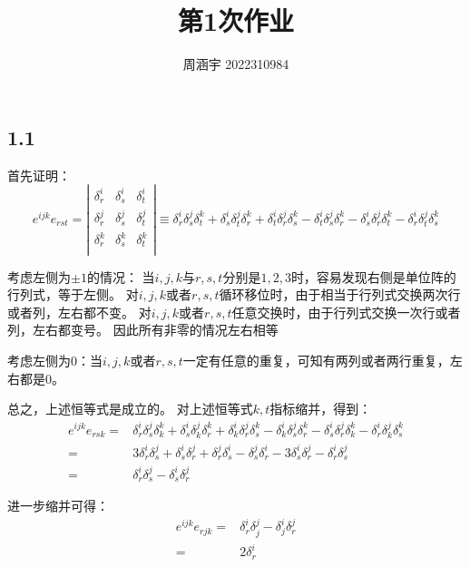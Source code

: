 \documentclass[UTF8,zihao=5]{ctexart}
\title{{\bfseries 第1次作业}}
\author{周涵宇 2022310984}
\date{}
\begin{document}
\maketitle

\subsection*{1.1}


首先证明：
\begin{equation*}
    e^{ijk}e_{rst}=
    \left|
    \begin{matrix}
        \delta^i_r & \delta^i_s & \delta^i_t \\
        \delta^j_r & \delta^j_s & \delta^j_t \\
        \delta^k_r & \delta^k_s & \delta^k_t \\
    \end{matrix}
    \right|
    \equiv 
    \delta^i_r\delta^j_s\delta^k_t +
    \delta^i_s\delta^j_t\delta^k_r +
    \delta^i_t\delta^j_r\delta^k_s -
    \delta^i_t\delta^j_s\delta^k_r -
    \delta^i_s\delta^j_r\delta^k_t -
    \delta^i_r\delta^j_t\delta^k_s
\end{equation*}

考虑左侧为$\pm 1$的情况：
当$i,j,k$与$r,s,t$分别是$1,2,3$时，容易发现右侧是单位阵的行列式，等于左侧。
对$i,j,k$或者$r,s,t$循环移位时，由于相当于行列式交换两次行或者列，左右都不变。
对$i,j,k$或者$r,s,t$任意交换时，由于行列式交换一次行或者列，左右都变号。
因此所有非零的情况左右相等

考虑左侧为$0$：当$i,j,k$或者$r,s,t$一定有任意的重复，可知有两列或者两行重复，左右都是0。

总之，上述恒等式是成立的。
对上述恒等式$k,t$指标缩并，得到：
\begin{equation*}
    \begin{aligned}
        e^{ijk}e_{rsk}=&
    \delta^i_r\delta^j_s\delta^k_k +
    \delta^i_s\delta^j_k\delta^k_r +
    \delta^i_k\delta^j_r\delta^k_s -
    \delta^i_k\delta^j_s\delta^k_r -
    \delta^i_s\delta^j_r\delta^k_k -
    \delta^i_r\delta^j_k\delta^k_s\\
    =&
    3\delta^i_r\delta^j_s +
    \delta^i_s\delta^j_r +
    \delta^j_r\delta^i_s -
    \delta^j_s\delta^i_r -
    3\delta^i_s\delta^j_r -
    \delta^i_r\delta^j_s 
    \\
    =&\delta^i_r\delta^j_s -
    \delta^i_s\delta^j_r 
    \end{aligned}
\end{equation*}

进一步缩并可得：
\begin{equation*}
    \begin{aligned}
        e^{ijk}e_{rjk}
    =&\delta^i_r\delta^j_j -
    \delta^i_j\delta^j_r \\
    =&2\delta^i_r
    \end{aligned}
\end{equation*}
\end{document}
